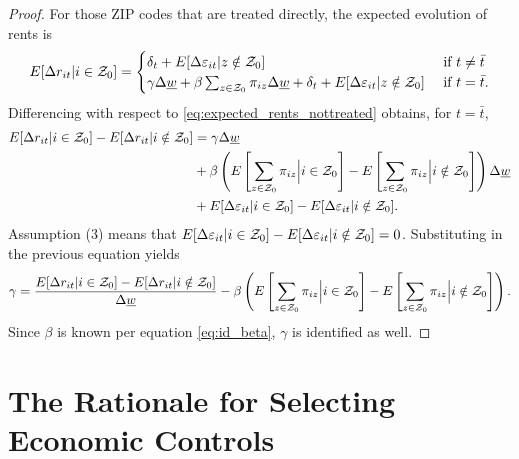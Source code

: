 \begin{proof}
    For those ZIP codes that are treated directly, the expected evolution of 
    rents is
    \begin{equation*}\label{eq:expected_rents_treated}
        E[\Delta r_{it} | i\in\mathcal{Z}_0] = 
        \begin{cases}
            \delta_t + E[\Delta \varepsilon_{it} | z\notin\mathcal{Z}_0] 
                                       & \text{ if } t\neq\bar{t} \\
            \gamma\Delta\underline{w} + \beta\sum_{z\in\mathcal{Z}_0}\pi_{iz}\Delta\underline{w} + \delta_t 
                     + E[\Delta \varepsilon_{it} | z\notin\mathcal{Z}_0] 
                                       & \text{ if } t=\bar{t} .
        \end{cases}
    \end{equation*}
    Differencing with respect to \ref{eq:expected_rents_nottreated} obtains, 
    for $t=\bar{t}$,
    \begin{equation*}
        \begin{split}
            E[\Delta r_{it} | i\in\mathcal{Z}_0] - E[\Delta r_{it} | i\notin\mathcal{Z}_0] 
              & = \gamma \Delta \underline{w}  \\
              & + \beta \left(E\left[\sum_{z\in\mathcal{Z}_0}\pi_{iz} \Big| i\in\mathcal{Z}_0\right]
                           - E\left[\sum_{z\in\mathcal{Z}_0}\pi_{iz} \Big| i\notin\mathcal{Z}_0\right]\right) \Delta \underline{w}  \\
              & + E[\Delta \varepsilon_{it} | i\in\mathcal{Z}_0] - E[\Delta \varepsilon_{it} | i\notin\mathcal{Z}_0] .
        \end{split}
    \end{equation*}
    Assumption (3) means that
    $E[\Delta \varepsilon_{it} | i\in\mathcal{Z}_0] 
      - E[\Delta \varepsilon_{it} | i\notin\mathcal{Z}_0] = 0$.
    Substituting in the previous equation yields
    \begin{equation}\label{eq:id_gamma}
        \gamma = \frac{E[\Delta r_{it} | i\in\mathcal{Z}_0] - E[\Delta r_{it} | i\notin\mathcal{Z}_0]}{\Delta\underline{w}}
            - \beta \left(E\left[\sum_{z\in\mathcal{Z}_0}\pi_{iz} \Big| i\in\mathcal{Z}_0   \right] 
                        - E\left[\sum_{z\in\mathcal{Z}_0}\pi_{iz} \Big| i\notin\mathcal{Z}_0\right]\right) .
    \end{equation}
    Since $\beta$ is known per equation \ref{eq:id_beta}, $\gamma$ is identified
    as well.
\end{proof}


\clearpage
\section{The Rationale for Selecting Economic Controls}\label{sec:app_econ_control}

